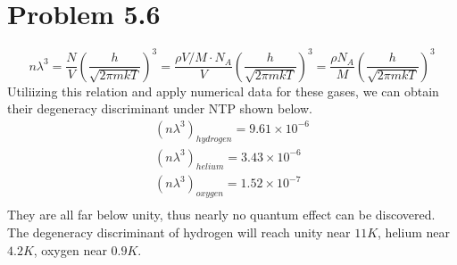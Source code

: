 \documentclass{article}
\begin{document}
\section*{Problem 5.6}
	\begin{equation}
		n\lambda^3=\frac{N}{V}(\frac{h}{\sqrt{2\pi m k T}})^3=\frac{\rho V / M \cdot N_A}{V}(\frac{h}{\sqrt{2\pi m k T}})^3=\frac{\rho N_A}{M}(\frac{h}{\sqrt{2\pi m k T}})^3
	\end{equation}
	Utiliizing this relation and apply numerical data for these gases, we can obtain their degeneracy discriminant under NTP shown below.
	\begin{align}
		(n\lambda^3)_{hydrogen}=9.61 \times 10^{-6}\\
		(n\lambda^3)_{helium}=3.43 \times 10^{-6}\\
		(n\lambda^3)_{oxygen}=1.52 \times 10^{-7}\\
	\end{align}
	They are all far below unity, thus nearly no quantum effect can be discovered.\\
	The degeneracy discriminant of hydrogen will reach unity near $11 K$, helium near $4.2K$, oxygen near $0.9K$.\\ 
\end{document}
